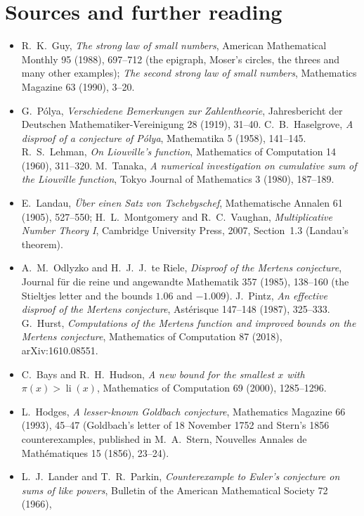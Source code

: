 \section*{Sources and further reading}

\begin{itemize}
\item R.~K.~Guy, \emph{The strong law of small numbers}, American Mathematical Monthly 95 (1988), 697--712 (the epigraph, Moser's circles, the threes and many
other examples); \emph{The second strong law of small numbers}, Mathematics Magazine 63 (1990), 3--20.
\item G.~P\'olya, \emph{Verschiedene Bemerkungen zur Zahlentheorie}, Jahresbericht der Deutschen Mathematiker-Vereinigung 28 (1919), 31--40.
C.~B.~Haselgrove, \emph{A disproof of a conjecture of P\'olya}, Mathematika 5 (1958), 141--145. R.~S.~Lehman, \emph{On Liouville's function}, Mathematics of
Computation 14 (1960), 311--320. M.~Tanaka, \emph{A numerical investigation on cumulative sum of the Liouville function}, Tokyo Journal of Mathematics 3 (1980),
187--189.
\item E.~Landau, \emph{\"Uber einen Satz von Tschebyschef}, Mathematische Annalen 61 (1905), 527--550; H.~L.~Montgomery and R.~C.~Vaughan, \emph{Multiplicative Number Theory I}, Cambridge University Press, 2007, Section~1.3 (Landau's theorem).
\item A.~M.~Odlyzko and H.~J.~J.~te Riele, \emph{Disproof of the Mertens conjecture}, Journal f\"ur die reine und angewandte Mathematik 357 (1985), 138--160
(the Stieltjes letter and the bounds $1.06$ and $-1.009$). J.~Pintz, \emph{An effective disproof of the Mertens conjecture}, Ast\'erisque 147--148 (1987),
325--333. G.~Hurst, \emph{Computations of the Mertens function and improved bounds on the Mertens conjecture}, Mathematics of Computation 87 (2018), arXiv:1610.08551.
\item C.~Bays and R.~H.~Hudson, \emph{A new bound for the smallest $x$ with $\pi(x)>\operatorname{li}(x)$}, Mathematics of Computation 69 (2000), 1285--1296.
\item L.~Hodges, \emph{A lesser-known Goldbach conjecture}, Mathematics Magazine 66 (1993), 45--47 (Goldbach's letter of 18 November 1752 and Stern's 1856
counterexamples, published in M.~A.~Stern, Nouvelles Annales de Math\'ematiques 15 (1856), 23--24).
\item L.~J.~Lander and T.~R.~Parkin, \emph{Counterexample to Euler's conjecture on sums of like powers}, Bulletin of the American Mathematical Society 72 (1966),

\end{itemize}
